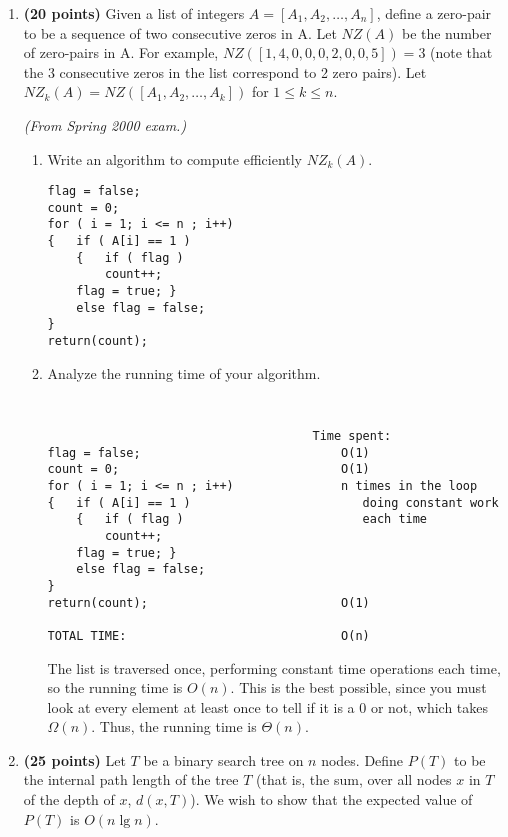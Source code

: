 \begin{enumerate}
    \item {\bf (20 points)}
	Given a list of integers $A= [A_1,A_2,\ldots, A_n]$, define
	a zero-pair to be a sequence of two consecutive zeros in A.
	Let $NZ(A)$ be the number of zero-pairs in A.  
	For example, $NZ([1,4,0,0,0,2,0,0,5]) = 3$ (note that the
	3 consecutive zeros in the list correspond to 2 zero pairs).
	Let $NZ_k(A) = NZ([A_1,A_2,\ldots,A_k])$ for $1\leq k \leq n$.

	{\em (From Spring 2000 exam.)}
	
	\begin{enumerate}
	    \item Write an algorithm to compute efficiently $NZ_k(A)$.

\begin{verbatim}
flag = false;
count = 0;
for ( i = 1; i <= n ; i++)
{   if ( A[i] == 1 )
    {   if ( flag )
	    count++; 
	flag = true; } 
    else flag = false;
}
return(count);
\end{verbatim}

	    \item Analyze the running time of your algorithm.

{\tt
\begin{verbatim}
                                     Time spent:
flag = false;                            O(1) 
count = 0;                               O(1)
for ( i = 1; i <= n ; i++)               n times in the loop
{   if ( A[i] == 1 )                        doing constant work
    {   if ( flag )                         each time
	    count++; 
	flag = true; } 
    else flag = false;
}
return(count);                           O(1)

TOTAL TIME:                              O(n)
\end{verbatim}

The list is traversed once, performing constant time operations each
time, so the running time is $O(n)$.  This is the best possible, since
you must look at every element at least once to tell if it is a 0 or
not, which takes $\Omega(n)$.  Thus, the running time is $\Theta(n)$.

}

	\end{enumerate}


    \item {\bf (25 points)} 
	Let $T$ be a binary search tree on $n$ nodes.  Define
	$P(T)$ to be the internal path length of the tree $T$
	(that is, the sum, over all nodes $x$ in $T$ of the 
	depth of $x$, $d(x,T)$).
	We wish to show that the expected value of $P(T)$ is
	$O(n\lg n)$.


\end{enumerate}
